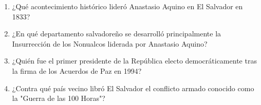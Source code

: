 \documentclass[10pt,a4paper]{article}
\begin{document}
\begin{enumerate}[label=\textbf{\arabic*.}]
\begin{enumerate}[label=\textbf{\Alph*)}]
\end{enumerate}
\vspace{0.15cm}
\item ¿Qué acontecimiento histórico lideró Anastasio Aquino en El Salvador en 1833?
\begin{enumerate}[label=\textbf{\Alph*)}]
\end{enumerate}
\vspace{0.15cm}
\item ¿En qué departamento salvadoreño se desarrolló principalmente la Insurrección de los Nonualcos liderada por Anastasio Aquino?
\begin{enumerate}[label=\textbf{\Alph*)}]
\end{enumerate}
\vspace{0.15cm}
\item ¿Quién fue el primer presidente de la República electo democráticamente tras la firma de los Acuerdos de Paz en 1994?
\begin{enumerate}[label=\textbf{\Alph*)}]
\end{enumerate}
\vspace{0.15cm}
\item ¿Contra qué país vecino libró El Salvador el conflicto armado conocido como la "Guerra de las 100 Horas"?

\end{enumerate}
\end{document}
